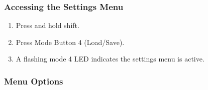 \subsubsection{Accessing the Settings
Menu}\label{accessing-the-settings-menu}

\begin{enumerate}
\def\labelenumi{\arabic{enumi}.}
\tightlist
\item
  Press and hold shift.
\item
  Press Mode Button 4 (Load/Save).
\item
  A flashing mode 4 LED indicates the settings menu is active.
\end{enumerate}

\subsubsection{Menu Options}\label{menu-options}

